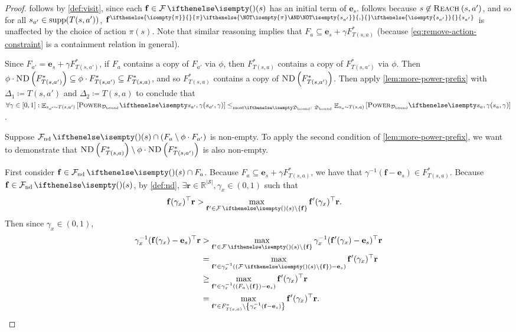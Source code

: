 \documentclass{article}
\renewcommand{\abs}[1]{\left|#1\right|}
\newcommand*{\prn}[1]{\left(#1\right)}
\newcommand*{\brx}[1]{\left[#1\right]}
\renewcommand{\set}[1]{\left\{#1\right\}}
\newcommand*{\defeq}{\coloneqq} %
\newcommand*{\reals}{\mathbb{R}}
\newcommand*{\unitvec}[1][s]{\mathbf{e}_{#1}}
\newcommand*{\upsc}[1]{\text{\upshape\textsc{#1}}}
\newcommand*{\St}{\mathcal{S}}
\newcommand*{\rf}{\mathbf{r}} %
\newcommand*{\rewardVS}{\reals^{\abs{\St}}} %
\newcommand*{\reach}[2][]{\upsc{Reach}_{#1}\prn{#2}}
\newcommand*{\D}{\mathcal{D}} %
\newcommand*{\distSet}{\mathfrak{D}}
\newcommand*{\Dbd}{\D_{\text{bound}}}
\newcommand*{\DSetBd}{\distSet_\text{bound}}
\DeclareMathOperator*{\opE}{\mathbb{E}}
\newcommand*{\E}[2]{\opE_{#1}\brx{#2}} %
\newcommand*{\f}{\mathbf{f}} %
\newcommand*{\fpi}[2][\pi]{\f^{
\ifthenelse{\isempty{#1}}{}{#1} %
\ifthenelse{\NOT\isempty{#1} \AND \NOT\isempty{#2}}{,}{} %
\ifthenelse{\isempty{#2}}{}{#2}}} %
\newcommand*{\ND}[1]{\upsc{ND}\prn{#1}}
\newcommand*{\inv}{^{-1}}
\theoremstyle{definition}
\begin{document}
\begin{appendices}
\begin{proof}
 follows by \cref{def:visit}, since each $\f\in\F(s)$ has an initial term of $\unitvec$.  follows because $s\not\in \reach{s,a'}$, and so for all $s_{a'}\in \supp[T(s,a')]$, $\fpi{s_{a'}}$ is unaffected by the choice of action $\pi(s)$. Note that similar reasoning implies that $F_a\subseteq \unitvec+\gamma F^*_{T(s,a)}$ (because \cref{eq:remove-action-constraint} is a containment relation in general).

Since $F_{a'}=\unitvec+\gamma F^*_{T(s,a')}$, if $F_a$ contains a copy of $F_{a'}$ via $\phi$, then $F^*_{T(s,a)}$ contains a copy of $F^*_{T(s,a')}$ via $\phi$. Then $\phi\cdot \ND{F^*_{T(s,a')}}\subseteq \phi\cdot F^*_{T(s,a')}\subseteq F^*_{T(s,a)}$, and so $F^*_{T(s,a)}$ contains a copy of $\ND{F^*_{T(s,a')}}$. Then apply \cref{lem:more-power-prefix} with $\Delta_1\defeq T(s,a')$ and $\Delta_2\defeq T(s,a)$ to conclude that $\forall\gamma\in[0,1]:\E{s_{a'}\sim T(s,a')}{\pwr[s_{a'},\gamma][\Dbd]}\leqMost[][\DSetBd] \E{s_{a}\sim T(s,a)}{\pwr[s_a,\gamma][\Dbd]}$. 

Suppose $\Fnd(s)\cap \prn{F_a\setminus \phi\cdot F_{a'}}$ is non-empty. To apply the second condition of \cref{lem:more-power-prefix}, we want to demonstrate that $\ND{F^*_{T(s,a)}}\setminus \phi\cdot \ND{F^*_{T(s,a')}}$ is also non-empty.

First consider $\f\in\Fnd(s)\cap F_a$. Because $F_a\subseteq \unitvec+\gamma F^*_{T(s,a)}$, we have that $\gamma\inv(\f - \unitvec)\in F^*_{T(s,a)}$. Because $\f \in \Fnd(s)$, by \cref{def:nd}, $\exists \rf \in \rewardVS, \gamma_x\in (0,1)$ such that
\begin{align}
    \f(\gamma_x)^\top\rf  &> \max_{\f'\in\F(s)\setminus \set{\f}}\f'(\gamma_x)^\top \rf.\label{eq:f-nd-def}
\end{align}
Then since $\gamma_x\in (0,1)$,
\begin{align}
    \gamma_x\inv(\f(\gamma_x)-\unitvec)^\top\rf  &> \max_{\f'\in\F(s)\setminus \set{\f}}\gamma_x\inv(\f'(\gamma_x)-\unitvec)^\top \rf\\
    &=\max_{\f'\in\gamma_x\inv\prn{(\F(s)\setminus \set{\f})-\unitvec}}\f'(\gamma_x)^\top \rf\\
    &\geq \max_{\f'\in \gamma_x\inv\prn{(F_a\setminus \set{\f})-\unitvec}}\f'(\gamma_x)^\top \rf\label{eq:Fact-contain}\\
    &= \max_{\f'\in F^*_{T(s,a)}\setminus \set{\gamma_x\inv(\f-\unitvec)}}\f'(\gamma_x)^\top \rf.\label{eq:FTsa}
\end{align}


\end{proof}
\end{appendices}
\end{document}

